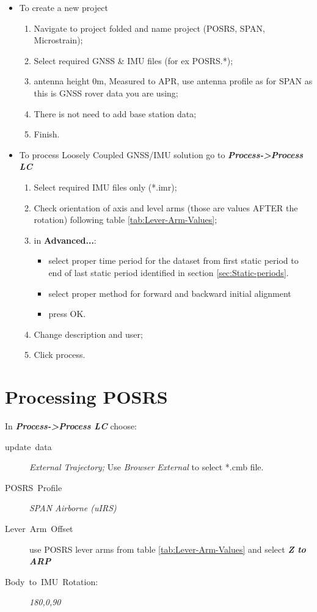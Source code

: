 \documentclass[11pt,fleqn]{book} %
\begin{document}
\begin{itemize}
	\item To create a new project 
	\begin{enumerate}
		\item Navigate to project folded and name project (POSRS, SPAN, Microstrain);
		\item Select required GNSS \& IMU files (for ex POSRS.{*});
		\item antenna height 0m, Measured to APR, use antenna profile as for SPAN as this is GNSS rover data you are using;
		\item There is not need to add base station data;
		\item Finish.
	\end{enumerate}
	\item To process Loosely Coupled GNSS/IMU solution go to \textbf{\emph{Process->Process LC}}
		\begin{enumerate}
			\item Select required IMU files only ({*}.imr);
			\item Check orientation of axis and level arms (those are values AFTER the rotation) following table \ref{tab:Lever-Arm-Values};
			\item in \textbf{Advanced...}:
			\begin{itemize}
			 	\item select proper time period for the dataset from first static period to end of last static period identified in section \ref{sec:Static-periods}.
			 	\item select proper method for forward and backward initial alignment
			 	\item press OK.
			 \end{itemize} 
			\item Change description and user;
			\item Click process.
		\end{enumerate}
\end{itemize}




\section{Processing POSRS\label{sub:Processing-POSRS}}

In \textbf{\emph{Process->Process LC}} choose:
\begin{description}
	\item [{update~data}] \emph{External Trajectory; }Use \emph{Browser External} to select {*}.cmb file.
	\item [{POSRS~Profile}] \emph{SPAN Airborne (uIRS)}
	\item [{Lever~Arm~Offset}] use POSRS lever arms from table \ref{tab:Lever-Arm-Values} and select \textbf{\emph{Z to ARP}}
	\item [{Body~to~IMU~Rotation:}] \emph{180,0,90 }
	\end{description}
	
\end{document}
